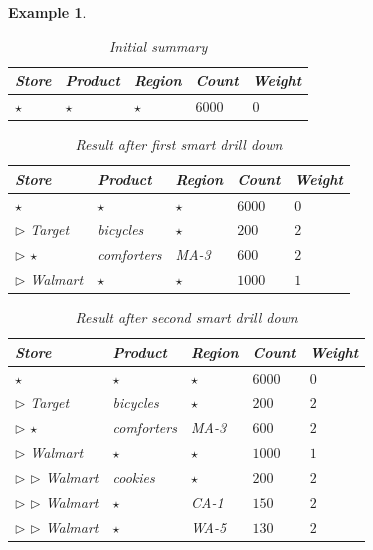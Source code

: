 \documentclass[10pt,journal,compsoc]{IEEEtran}
\newtheorem{example}[definition]{Example}
\begin{document}
\begin{example}
\begin{table}
\scriptsize
\centering
\begin{tabular}{| l | l | l | l | l |}
\hline Store & Product & Region & Count & Weight \\
\hline
$\star$ & $\star$ & $\star$ & $6000$ & $0$ \\ \hline
\end{tabular}
\caption{Initial summary}\label{table:introexample0}
\vspace{-10pt}
\end{table}

\begin{table}
\scriptsize
\centering
\begin{tabular}{| l | l | l | l | l |}
\hline Store & Product & Region & Count & Weight \\
\hline
$\star$ & $\star$ & $\star$ & $6000$ & $0$ \\ \hline
$\triangleright$ Target & bicycles & $\star$ & $200$ & $2$ \\ \hline
$\triangleright$ $\star$ & comforters & MA-3 & $600$ & $2$ \\ \hline
$\triangleright$ Walmart & $\star$ & $\star$ & $1000$ & $1$ \\ \hline
\end{tabular}
\caption{Result after first smart drill down}\label{table:introexample}
\vspace{-20pt}
\end{table}

\begin{table}
\vspace{-10pt}
\scriptsize
\centering
\begin{tabular}{| l | l | l | l | l |}
\hline Store & Product & Region & Count & Weight \\
\hline
$\star$ & $\star$ & $\star$ & $6000$ & $0$ \\  \cline{1-5}
$\triangleright$ Target & bicycles & $\star$ & $200$ & $2$ \\ \cline{1-5}
$\triangleright$ $\star$ & comforters & MA-3 & $600$ & $2$ \\ \cline{1-5}
$\triangleright$ Walmart & $\star$ & $\star$ & $1000$ & $1$ \\ \cline{2-5}
$\triangleright$ $\triangleright$ Walmart & cookies & $\star$ & $200$ & $2$ \\ \cline{2-5}
$\triangleright$ $\triangleright$ Walmart & $\star$ & CA-1 & $150$ & $2$ \\ \cline{2-5}
$\triangleright$ $\triangleright$ Walmart & $\star$ & WA-5 & $130$ & $2$ \\ \hline
\end{tabular}
\caption{Result after second smart drill down} \label{table:introexample2}
\vspace{-10pt}
\end{table}


\end{example}
\end{document}
